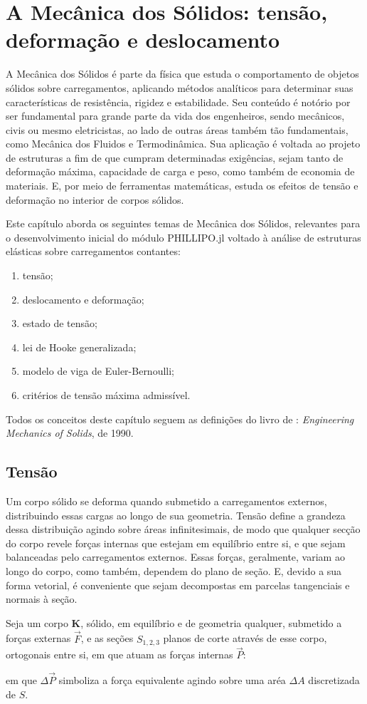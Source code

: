 \chapter{A Mecânica dos Sólidos: tensão, deformação e deslocamento}

A Mecânica dos Sólidos é parte da física que estuda o comportamento de objetos sólidos sobre carregamentos, aplicando métodos analíticos para determinar suas características de resistência, rigidez e estabilidade. Seu conteúdo é notório por ser fundamental para grande parte da vida dos engenheiros, sendo mecânicos, civis ou mesmo eletricistas, ao lado de outras áreas também tão fundamentais, como Mecânica dos Fluidos e Termodinâmica. Sua aplicação é voltada ao projeto de estruturas a fim de que cumpram determinadas exigências, sejam tanto de deformação máxima, capacidade de carga e peso, como também de economia de materiais. E, por meio de ferramentas matemáticas, estuda os efeitos de tensão e deformação no interior de corpos sólidos. \cite{popov}

Este capítulo aborda os seguintes temas de Mecânica dos Sólidos, relevantes para o desenvolvimento inicial do módulo PHILLIPO.jl voltado à análise de estruturas elásticas sobre carregamentos contantes:
\begin{enumerate}
    \item tensão;
    \item deslocamento e deformação;
    \item estado de tensão;
    \item lei de Hooke generalizada;
    \item modelo de viga de Euler-Bernoulli;
    \item critérios de tensão máxima admissível.
\end{enumerate}

Todos os conceitos deste capítulo seguem as definições do livro de \citeauthor{popov}: \emph{Engineering Mechanics of Solids}, de 1990.

\section{Tensão}

Um corpo sólido se deforma quando submetido a carregamentos externos, distribuindo essas cargas ao longo de sua geometria. Tensão define a grandeza dessa distribuição agindo sobre áreas infinitesimais, de modo que qualquer secção do corpo revele forças internas que estejam em equilíbrio entre si, e que sejam balanceadas pelo carregamentos externos. Essas forças, geralmente, variam ao longo do corpo, como também, dependem do plano de seção. E, devido a sua forma vetorial, é conveniente que sejam decompostas em parcelas tangenciais e normais à seção. \cite{popov}

Seja um corpo $\bm{K}$, sólido, em equilíbrio e de geometria qualquer, submetido a forças externas $\vec{F}$, e as seções $S_{1,2,3}$ planos de corte através de esse corpo, ortogonais entre si, em que atuam as forças internas $\vec{P}$:



em que $\Delta\vec{P}$ simboliza a força equivalente agindo  sobre uma aréa $\Delta A$ discretizada de $S$.
